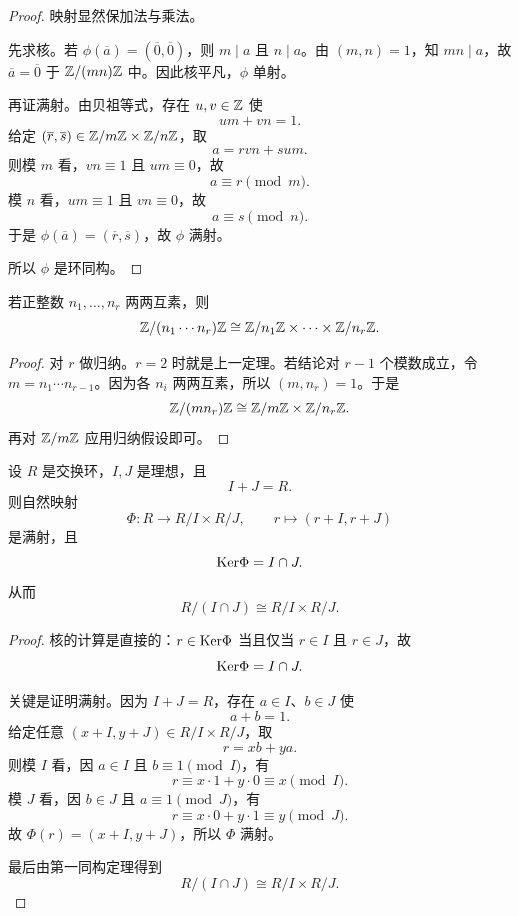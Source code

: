 \begin{proof}
映射显然保加法与乘法。

先求核。若 $\phi(\overline{a})=(\overline{0},\overline{0})$，则 $m\mid a$ 且 $n\mid a$。由 $(m,n)=1$，知 $mn\mid a$，故 $\overline{a}=\overline{0}$ 于 $\mathbb{Z}/(mn)\mathbb{Z}$ 中。因此核平凡，$\phi$ 单射。

再证满射。由贝祖等式，存在 $u,v\in\mathbb{Z}$ 使
\[
um+vn=1.
\]
给定 $(\overline{r},\overline{s})\in \mathbb{Z}/m\mathbb{Z}\times \mathbb{Z}/n\mathbb{Z}$，取
\[
a=rvn+sum.
\]
则模 $m$ 看，$vn\equiv 1$ 且 $um\equiv 0$，故
\[
a\equiv r\pmod m.
\]
模 $n$ 看，$um\equiv 1$ 且 $vn\equiv 0$，故
\[
a\equiv s\pmod n.
\]
于是 $\phi(\overline{a})=(\overline{r},\overline{s})$，故 $\phi$ 满射。

所以 $\phi$ 是环同构。
\end{proof}

\begin{corollary}
若正整数 $n_1,\dots,n_r$ 两两互素，则
\[
\mathbb{Z}/(n_1\cdots n_r)\mathbb{Z}\cong \mathbb{Z}/n_1\mathbb{Z}\times\cdots\times \mathbb{Z}/n_r\mathbb{Z}.
\]
\end{corollary}

\begin{proof}
对 $r$ 做归纳。$r=2$ 时就是上一定理。若结论对 $r-1$ 个模数成立，令 $m=n_1\cdots n_{r-1}$。因为各 $n_i$ 两两互素，所以 $(m,n_r)=1$。于是
\[
\mathbb{Z}/(mn_r)\mathbb{Z}\cong \mathbb{Z}/m\mathbb{Z}\times \mathbb{Z}/n_r\mathbb{Z}.
\]
再对 $\mathbb{Z}/m\mathbb{Z}$ 应用归纳假设即可。
\end{proof}

\begin{theorem}
设 $R$ 是交换环，$I,J$ 是理想，且
\[
I+J=R.
\]
则自然映射
\[
\Phi:R\longrightarrow R/I\times R/J,
\qquad r\longmapsto (r+I,r+J)
\]
是满射，且
\[
\mathrm{Ker}\Phi=I\cap J.
\]
从而
\[
R/(I\cap J)\cong R/I\times R/J.
\]
\end{theorem}

\begin{proof}
核的计算是直接的：$r\in\mathrm{Ker}\Phi$ 当且仅当 $r\in I$ 且 $r\in J$，故
\[
\mathrm{Ker}\Phi=I\cap J.
\]

关键是证明满射。因为 $I+J=R$，存在 $a\in I$、$b\in J$ 使
\[
a+b=1.
\]
给定任意 $(x+I,y+J)\in R/I\times R/J$，取
\[
r=xb+ya.
\]
则模 $I$ 看，因 $a\in I$ 且 $b\equiv 1\pmod I$，有
\[
r\equiv x\cdot 1+y\cdot 0\equiv x \pmod I.
\]
模 $J$ 看，因 $b\in J$ 且 $a\equiv 1\pmod J$，有
\[
r\equiv x\cdot 0+y\cdot 1\equiv y \pmod J.
\]
故 $\Phi(r)=(x+I,y+J)$，所以 $\Phi$ 满射。

最后由第一同构定理得到
\[
R/(I\cap J)\cong R/I\times R/J.
\]
\end{proof}

